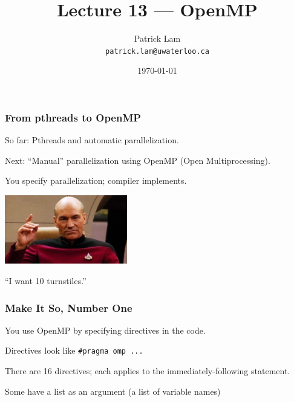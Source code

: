 

\title{Lecture 13 --- OpenMP}

\author{Patrick Lam \\ \small \texttt{patrick.lam@uwaterloo.ca}}
\date{\today}




\begin{frame}
  \titlepage

 \end{frame}

\begin{frame}[containsverbatim]
  \frametitle{From pthreads to OpenMP}


    So far: Pthreads and automatic parallelization.
    
    Next: ``Manual'' parallelization using OpenMP (Open Multiprocessing).
          
    You specify parallelization; compiler implements.
    
    \begin{center}
    \includegraphics[width=0.4\textwidth]{images/makeitso.jpg}
    \end{center}
    
    ``I want 10 turnstiles.''


\end{frame}

\begin{frame}
  \frametitle{Make It So, Number One}

You use OpenMP by specifying \alert{directives} in the code.

Directives look like \texttt{\#pragma omp ...}

There are 16 directives; each applies to the immediately-following statement.

Some have a list as an argument (a list of variable names)

\end{frame}


